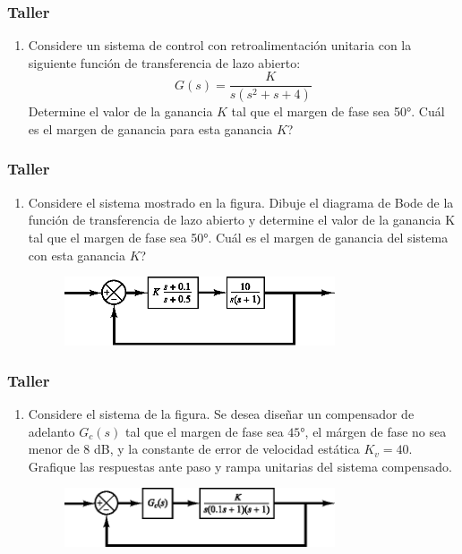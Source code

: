 \documentclass[aspectratio=169, handout]{beamer}
\theoremstyle{definition}
\theoremstyle{plain}
\theoremstyle{remark}
\newcounter{saveenumi}
\newcommand{\seti}{\setcounter{saveenumi}{\value{enumi}}}
\newcommand{\conti}{\setcounter{enumi}{\value{saveenumi}}}
\begin{document}
\begin{frame}[c]\frametitle{Taller}
\begin{enumerate}
	\conti
	\item Considere un sistema de control con retroalimentación unitaria con la siguiente función de transferencia de lazo abierto:
	\begin{equation*}
		G(s) = \frac{K}{s(s^2+s+4)}
	\end{equation*}
	Determine el valor de la ganancia $K$ tal que el margen de fase sea \ang{50}. Cuál es el margen de ganancia para esta ganancia $K$?
	\seti 
\end{enumerate}
\end{frame}

\begin{frame}[c]\frametitle{Taller}
\begin{enumerate}
	\conti
	\item Considere el sistema mostrado en la figura. Dibuje el diagrama de Bode de la función de transferencia de lazo abierto y determine el valor de la ganancia K tal que el margen de fase sea \ang{50}. Cuál es el margen de ganancia del sistema con esta ganancia $K$?
	\begin{figure}
		\centering
		\includegraphics[width=8cm]{images/exercise3.eps}
	\end{figure}
	\seti 
\end{enumerate}
\end{frame}

\begin{frame}[c]\frametitle{Taller}
\begin{enumerate}
	\conti
	\item Considere el sistema de la figura. Se desea diseñar un compensador de adelanto $G_c(s)$ tal que el margen de fase sea $\ang{45}$, el márgen de fase no sea menor de 8 dB, y la constante de error de velocidad estática $K_v = 40$. Grafique las respuestas ante paso y rampa unitarias del sistema compensado.
	\begin{figure}
		\centering
		\includegraphics[width=8cm]{images/exercise4.eps}
	\end{figure}
	\seti 
\end{enumerate}
\end{frame}
\end{document}
